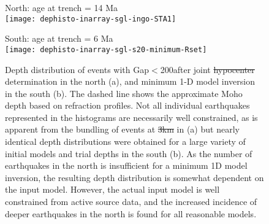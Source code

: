 \documentclass[reviewcopy]{elsart}
\renewcommand{\includegraphics}[2][]{\fbox{#2}}
\providecommand{\DIFadd}[1]{{\protect\color{blue}\uwave{#1}}} %
\providecommand{\DIFdel}[1]{{\protect\color{red}\sout{#1}}}                      %
\providecommand{\DIFaddFL}[1]{\DIFadd{#1}} %
\providecommand{\DIFdelFL}[1]{\DIFdel{#1}} %
\providecommand{\DIFaddbeginFL}{} %
\providecommand{\DIFaddendFL}{} %
\providecommand{\DIFdelbeginFL}{} %
\providecommand{\DIFdelendFL}{} %
\begin{document}
\begin{figure}

\DIFdelbeginFL %
\DIFdelendFL \DIFaddbeginFL \begin{minipage}[t]{0.4\textwidth}
\DIFaddendFL { North: age at trench = 14 Ma} \\
\texttt{[image: dephisto-inarray-sgl-ingo-STA1]}
\end{minipage}\hfill%
\DIFdelbeginFL %
\DIFdelendFL \DIFaddbeginFL \begin{minipage}[t]{0.4\textwidth}
\DIFaddendFL { South: age at trench = 6 Ma} \\
\texttt{[image: dephisto-inarray-sgl-s20-minimum-Rset]}
\end{minipage}


\caption{Depth distribution of events with
  Gap$<$200\dg\DIFaddbeginFL \DIFaddFL{\ }\DIFaddendFL after  joint
  \DIFdelbeginFL \DIFdelFL{hypocenter }\DIFdelendFL \DIFaddbeginFL \DIFaddFL{hypocentre }\DIFaddendFL determination in the north (a), and minimum 1-D model
inversion in the south (b). The
  dashed line shows the approximate Moho depth based on refraction
profiles. 
Not all individual earthquakes represented in the
  histograms are necessarily well constrained, as is apparent from the
  bundling of events at \DIFdelbeginFL \DIFdelFL{3km }\DIFdelendFL \DIFaddbeginFL \DIFaddFL{3~km }\DIFaddendFL in (a) but nearly identical depth distributions were
  obtained for a large variety of initial models and trial depths in
  the south
  (b).  As the number of earthquakes in the north is insufficient for
  a minimum 1D model inversion, the resulting depth distribution is
  somewhat dependent on the input model.  However, the actual input model
  is well constrained from active source data, and the increased
  incidence of deeper earthquakes in the north is found for all
  reasonable models. 
} 
\label{fig:dephistos}
\end{figure}
\end{document}
